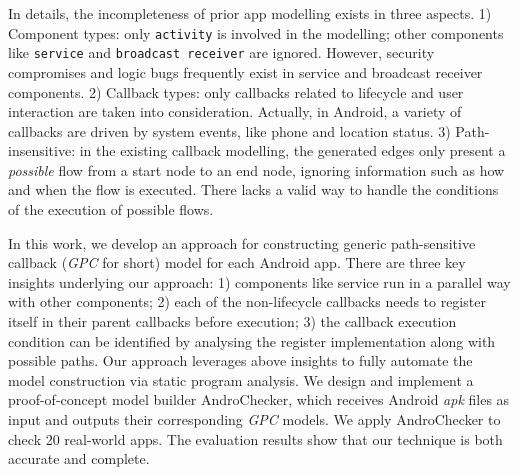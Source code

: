
In details, the incompleteness of prior app modelling exists in three aspects. 1) Component types: only \texttt{activity} is involved in the modelling; other components like \texttt{service} and \texttt{broadcast receiver} are ignored. However, security compromises and logic bugs frequently exist in service and broadcast receiver components. 2) Callback types: only callbacks related to lifecycle and user interaction are taken into consideration. Actually, in Android, a variety of callbacks are driven by system events, like phone and location status. 
3) Path-insensitive: in the existing callback modelling, the generated edges only present a \textit{possible} flow from a start node to an end node, ignoring information such as how and when the flow is executed. There lacks a valid way to handle the conditions of the execution of possible flows.
 
   

In this work, we develop an approach for constructing generic path-sensitive callback (\textit{GPC} for short) model for each Android app.
There are three key insights underlying our approach: 1) components like service run in a parallel way with other components; 2) each of the non-lifecycle callbacks needs to register itself in their parent callbacks before execution; 3) the callback execution condition can be identified by analysing the register implementation along with possible paths. Our approach leverages above insights to fully automate the model construction via static program analysis. 
%
We design and implement a proof-of-concept model builder AndroChecker, which receives Android \textit{apk} files as input and outputs their corresponding \textit{GPC} models. We apply AndroChecker to check 20 real-world apps. The evaluation results show that our technique is both accurate and complete. 

